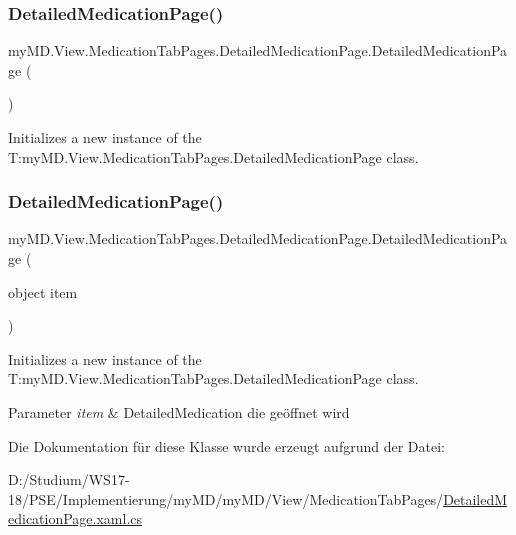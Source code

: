 \subsubsection{\texorpdfstring{Detailed\+Medication\+Page()}{DetailedMedicationPage()}\hspace{0.1cm}{\footnotesize\ttfamily [1/2]}}
{\footnotesize\ttfamily my\+M\+D.\+View.\+Medication\+Tab\+Pages.\+Detailed\+Medication\+Page.\+Detailed\+Medication\+Page (\begin{DoxyParamCaption}{ }\end{DoxyParamCaption})}



Initializes a new instance of the T\+:my\+M\+D.\+View.\+Medication\+Tab\+Pages.\+Detailed\+Medication\+Page class. 

\mbox{\label{classmy_m_d_1_1_view_1_1_medication_tab_pages_1_1_detailed_medication_page_a85fb3c6227ab81ef9b263263d76726b9}} 
\subsubsection{\texorpdfstring{Detailed\+Medication\+Page()}{DetailedMedicationPage()}\hspace{0.1cm}{\footnotesize\ttfamily [2/2]}}
{\footnotesize\ttfamily my\+M\+D.\+View.\+Medication\+Tab\+Pages.\+Detailed\+Medication\+Page.\+Detailed\+Medication\+Page (\begin{DoxyParamCaption}\item[{object}]{item }\end{DoxyParamCaption})}



Initializes a new instance of the T\+:my\+M\+D.\+View.\+Medication\+Tab\+Pages.\+Detailed\+Medication\+Page class. 


\begin{DoxyParams}{Parameter}
{\em item} & Detailed\+Medication die geöffnet wird\\
\hline
\end{DoxyParams}


Die Dokumentation für diese Klasse wurde erzeugt aufgrund der Datei\+:\begin{DoxyCompactItemize}
\item 
D\+:/\+Studium/\+W\+S17-\/18/\+P\+S\+E/\+Implementierung/my\+M\+D/my\+M\+D/\+View/\+Medication\+Tab\+Pages/\mbox{\hyperlink{_detailed_medication_page_8xaml_8cs}{Detailed\+Medication\+Page.\+xaml.\+cs}}\end{DoxyCompactItemize}
